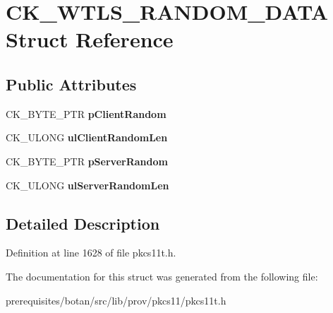 \hypertarget{struct_c_k___w_t_l_s___r_a_n_d_o_m___d_a_t_a}{}\section{C\+K\+\_\+\+W\+T\+L\+S\+\_\+\+R\+A\+N\+D\+O\+M\+\_\+\+D\+A\+TA Struct Reference}
\label{struct_c_k___w_t_l_s___r_a_n_d_o_m___d_a_t_a}
\subsection*{Public Attributes}
\begin{DoxyCompactItemize}
\item 
\mbox{\label{struct_c_k___w_t_l_s___r_a_n_d_o_m___d_a_t_a_a3796698993739c56f2578a0554fba33a}} 
C\+K\+\_\+\+B\+Y\+T\+E\+\_\+\+P\+TR {\bfseries p\+Client\+Random}
\item 
\mbox{\label{struct_c_k___w_t_l_s___r_a_n_d_o_m___d_a_t_a_a821ad4fcd011c6211ebaa6f4ede6e6b8}} 
C\+K\+\_\+\+U\+L\+O\+NG {\bfseries ul\+Client\+Random\+Len}
\item 
\mbox{\label{struct_c_k___w_t_l_s___r_a_n_d_o_m___d_a_t_a_a45281876a3693977cc419fc41e026c72}} 
C\+K\+\_\+\+B\+Y\+T\+E\+\_\+\+P\+TR {\bfseries p\+Server\+Random}
\item 
\mbox{\label{struct_c_k___w_t_l_s___r_a_n_d_o_m___d_a_t_a_a7701c5a19b31181433fe42690e5a3e4b}} 
C\+K\+\_\+\+U\+L\+O\+NG {\bfseries ul\+Server\+Random\+Len}
\end{DoxyCompactItemize}


\subsection{Detailed Description}


Definition at line 1628 of file pkcs11t.\+h.



The documentation for this struct was generated from the following file\+:\begin{DoxyCompactItemize}
\item 
prerequisites/botan/src/lib/prov/pkcs11/pkcs11t.\+h\end{DoxyCompactItemize}
